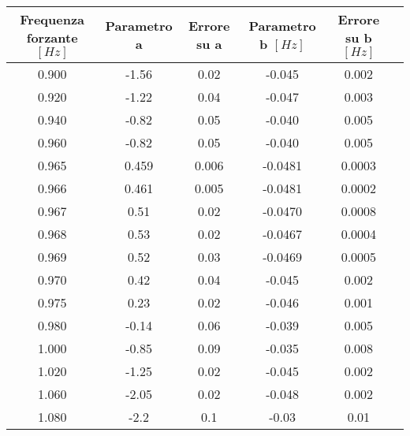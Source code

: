 \begin{tabular}{cccccc}
\toprule
Frequenza forzante $[Hz]$ & Parametro a & Errore su a & Parametro b $[Hz]$ & Errore su b $[Hz]$\\ \midrule
0.900 & -1.56 & 0.02 & -0.045 & 0.002 \\ \midrule
0.920 & -1.22 & 0.04 & -0.047 & 0.003 \\ \midrule    
0.940 & -0.82 & 0.05 & -0.040 & 0.005 \\ \midrule
0.960 & -0.82 & 0.05 & -0.040 & 0.005 \\ \midrule
0.965 & 0.459 & 0.006 & -0.0481 & 0.0003 \\ \midrule
0.966 & 0.461 & 0.005 & -0.0481 & 0.0002 \\ \midrule
0.967 & 0.51 & 0.02 & -0.0470 & 0.0008 \\ \midrule
0.968 & 0.53 & 0.02 & -0.0467 & 0.0004 \\ \midrule
0.969 & 0.52 & 0.03 & -0.0469 & 0.0005 \\ \midrule
0.970 & 0.42 & 0.04 & -0.045 & 0.002 \\ \midrule
0.975 & 0.23 & 0.02 & -0.046 & 0.001 \\ \midrule
0.980 & -0.14 & 0.06 & -0.039 & 0.005 \\ \midrule
1.000 & -0.85 & 0.09 & -0.035 & 0.008 \\ \midrule
1.020 & -1.25 & 0.02 & -0.045 & 0.002 \\ \midrule
1.060 & -2.05 & 0.02 & -0.048 & 0.002 \\ \midrule
1.080 & -2.2 & 0.1 & -0.03 & 0.01 \\ \bottomrule
\end{tabular}
